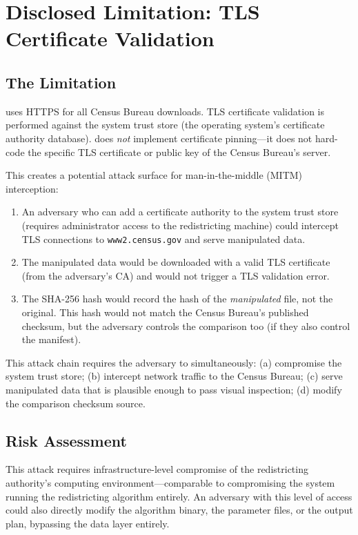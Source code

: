 \section{Disclosed Limitation: TLS Certificate Validation}
\label{sec:tls}

\subsection{The Limitation}

\bisect{} uses HTTPS for all Census Bureau downloads.
TLS certificate validation is performed against the system trust store
(the operating system's certificate authority database).
\bisect{} does \emph{not} implement certificate pinning---it does not
hard-code the specific TLS certificate or public key of the Census Bureau's
server.

This creates a potential attack surface for man-in-the-middle (MITM)
interception:
\begin{enumerate}
\item An adversary who can add a certificate authority to the system trust
  store (requires administrator access to the redistricting machine) could
  intercept TLS connections to \texttt{www2.census.gov} and serve
  manipulated data.
\item The manipulated data would be downloaded with a valid TLS certificate
  (from the adversary's CA) and would not trigger a TLS validation error.
\item The \bisect{} SHA-256 hash would record the hash of the \emph{manipulated}
  file, not the original.
  This hash would not match the Census Bureau's published checksum,
  but the adversary controls the comparison too (if they also control
  the manifest).
\end{enumerate}

This attack chain requires the adversary to simultaneously:
(a) compromise the system trust store;
(b) intercept network traffic to the Census Bureau;
(c) serve manipulated data that is plausible enough to pass visual inspection;
(d) modify the comparison checksum source.

\subsection{Risk Assessment}

This attack requires infrastructure-level compromise of the redistricting
authority's computing environment---comparable to compromising the system
running the redistricting algorithm entirely.
An adversary with this level of access could also directly modify the
algorithm binary, the parameter files, or the output plan, bypassing the
data layer entirely.

